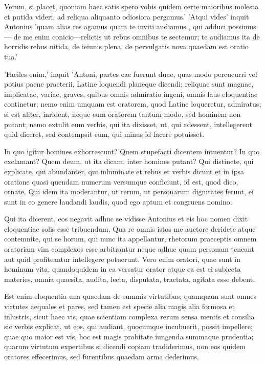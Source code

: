  Verum, si placet, quoniam haec satis spero vobis quidem certe maioribus molesta et putida videri, ad reliqua aliquanto odiosiora pergamus.' 'Atqui vides' inquit Antonius 'quam alias res agamus quam te inviti audiamus , qui adduci possimus— de me enim conicio—relictis ut rebus omnibus te sectemur; te audiamus ita de horridis rebus nitida, de ieiunis plena, de pervulgatis nova quaedam est oratio tua.'

 'Faciles enim,' inquit 'Antoni, partes eae fuerunt duae, quas modo percucurri vel potius paene praeterii, Latine loquendi planeque dicendi; reliquae sunt magnae, implicatae, variae, graves, quibus omnis admiratio ingeni, omnis laus eloquentiae continetur; nemo enim umquam est oratorem, quod Latine loqueretur, admiratus; si est aliter, inrident, neque eum oratorem tantum modo, sed hominem non putant; nemo extulit eum verbis, qui ita dixisset, ut, qui adessent, intellegerent quid diceret, sed contempsit eum, qui minus id facere potuisset.

 In quo igitur homines exhorrescunt? Quem stupefacti dicentem intuentur? In quo exclamant? Quem deum, ut ita dicam, inter homines putant? Qui distincte, qui explicate, qui abundanter, qui inluminate et rebus et verbis dicunt et in ipsa oratione quasi quendam numerum versumque conficiunt, id est, quod dico, ornate. Qui idem ita moderantur, ut rerum, ut personarum dignitates ferunt, ei sunt in eo genere laudandi laudis, quod ego aptum et congruens nomino.

 Qui ita dicerent, eos negavit adhuc se vidisse Antonius et eis hoc nomen dixit eloquentiae solis esse tribuendum. Qua re omnis istos me auctore deridete atque contemnite, qui se horum, qui nunc ita appellantur, rhetorum praeceptis omnem oratoriam vim complexos esse arbitrantur neque adhuc quam personam teneant aut quid profiteantur intellegere potuerunt. Vero enim oratori, quae sunt in hominum vita, quandoquidem in ea versatur orator atque ea est ei subiecta materies, omnia quaesita, audita, lecta, disputata, tractata, agitata esse debent.

 Est enim eloquentia una quaedam de summis virtutibus; quamquam sunt omnes virtutes aequales et pares, sed tamen est specie alia magis alia formosa et inlustris, sicut haec vis, quae scientiam complexa rerum sensa mentis et consilia sic verbis explicat, ut eos, qui audiant, quocumque incubuerit, possit impellere; quae quo maior est vis, hoc est magis probitate iungenda summaque prudentia; quarum virtutum expertibus si dicendi copiam tradiderimus, non eos quidem oratores effecerimus, sed furentibus quaedam arma dederimus.

